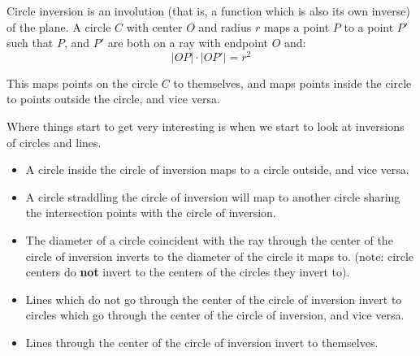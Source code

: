 \documentclass{article}
\begin{document}
Circle inversion is an involution (that is, a function which is also its own inverse) 
of the plane. A circle $C$ with center $O$ and radius $r$ maps a point $P$ to a point $P'$
such that $P$, and $P'$ are both on a ray with endpoint $O$ and:
\[ |OP|\cdot |OP'| = r^2 \]

This maps points on the circle $C$ to themselves, and maps points inside the circle to
points outside the circle, and vice versa.


Where things start to get very interesting is when we start to look at inversions of
circles and lines.

\begin{itemize}
	\item A circle inside the circle of inversion maps to a circle outside, and vice versa.
	\item A circle straddling the circle of inversion will map to another circle sharing the
		intersection points with the circle of inversion.
	\item The diameter of a circle coincident with the ray through the center of the circle of
		inversion inverts to the diameter of the circle it maps to. (note: circle centers
		do \textbf{not} invert to the centers of the circles they invert to).
	\item Lines which do not go through the center of the circle of inversion invert to circles
		which go through the center of the circle of inversion, and vice versa.
	\item Lines through the center of the circle of inversion invert to themselves.
\end{itemize}
\end{document}
